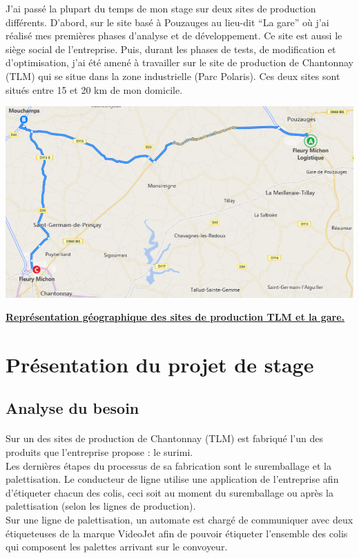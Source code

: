 \documentclass[a4paper,12pt]{extarticle}
\newcommand{\espace}{\vspace{0.3cm}}
\begin{document}
	J’ai passé la plupart du temps de mon stage sur deux sites de production différents. D’abord, sur le site basé à Pouzauges au lieu-dit “La gare” où j’ai réalisé mes premières phases d’analyse et de développement. Ce site est aussi le siège social de l’entreprise. Puis, durant les phases de tests, de modification et d’optimisation, j’ai été amené à travailler sur le site de production de Chantonnay (TLM) qui se situe dans la zone industrielle (Parc Polaris). Ces deux sites sont situés entre 15 et 20 km de mon domicile.\\

\centerline{\includegraphics[scale=0.50]{Img/Img_SituationGeo}}
\centerline{\textbf{\underline{Représentation géographique des sites de production TLM et la gare.}}}
\espace{}

	\clearpage
	
	\section{Présentation du projet de stage}
	
	\subsection{Analyse du besoin}
		\paragraph{}
	
	Sur un des sites de production de Chantonnay (TLM) est fabriqué l’un des produits que l’entreprise propose : le surimi.\\
Les dernières étapes du processus de sa fabrication sont le suremballage et la palettisation. Le conducteur de ligne utilise une application de l’entreprise afin d’étiqueter chacun des colis, ceci soit au moment du suremballage ou après la palettisation (selon les lignes de production).\\
Sur une ligne de palettisation, un automate est chargé de communiquer avec deux étiqueteuses de la marque VideoJet afin de pouvoir étiqueter l’ensemble des colis qui composent les palettes arrivant sur le convoyeur.\\
\end{document}
